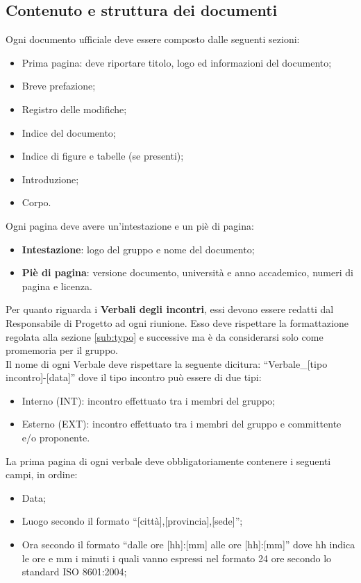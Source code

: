 {	\subsection{Contenuto e struttura dei documenti}{
		\label{sub:content}
		Ogni documento ufficiale deve essere composto dalle seguenti sezioni:
		\begin{itemize}
			\item Prima pagina: deve riportare titolo, logo ed informazioni del documento;
			\item Breve prefazione;
			\item Registro delle modifiche;
			\item Indice del documento;
			\item Indice di figure e tabelle (se presenti);
			\item Introduzione;
			\item Corpo.
		\end{itemize}
		Ogni pagina deve avere un'intestazione e un piè di pagina:
		\begin{itemize}
			\item \textbf{Intestazione}: logo del gruppo e nome del documento;
			\item \textbf{Piè di pagina}: versione documento, università e anno accademico, numeri di pagina e licenza.
		\end{itemize}
		Per quanto riguarda i \textbf{Verbali degli incontri}, essi devono essere redatti dal Responsabile di Progetto ad ogni riunione. Esso deve rispettare la formattazione regolata alla sezione \ref{sub:typo} e successive ma è da considerarsi solo come promemoria per il gruppo.\\
		Il nome di ogni Verbale deve rispettare la seguente dicitura: “Verbale\_[tipo incontro]-[data]” dove il tipo incontro può essere di due tipi:
		\begin{itemize}
			\item Interno (INT): incontro effettuato tra i membri del gruppo;
			\item Esterno (EXT): incontro effettuato tra i membri del gruppo e committente e/o proponente.
		\end{itemize}
		La prima pagina di ogni verbale deve obbligatoriamente contenere i seguenti campi, in ordine:
		\begin{itemize}
			\item Data;
			\item Luogo secondo il formato “[città],[provincia],[sede]”;
			\item Ora secondo il formato “dalle ore [hh]:[mm] alle ore [hh]:[mm]” dove hh indica le ore e mm i minuti i quali vanno espressi nel formato 24 ore secondo lo standard ISO 8601:2004;

\end{itemize}}}
